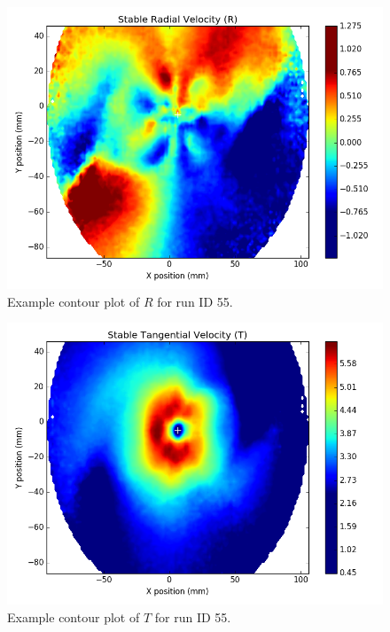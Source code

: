 \begin{figure}[H]
	\centering
	\includegraphics[width=5in]{figs/example_vortex_figs/example_R_contour}
\caption{Example contour plot of $R$ for run ID 55.}
\label{fig:examp_R}
\end{figure}

\begin{figure}[H]
	\centering
	\includegraphics[width=5in]{figs/example_vortex_figs/example_T_contour}
\caption{Example contour plot of $T$ for run ID 55.}
\label{fig:examp_T}
\end{figure}

